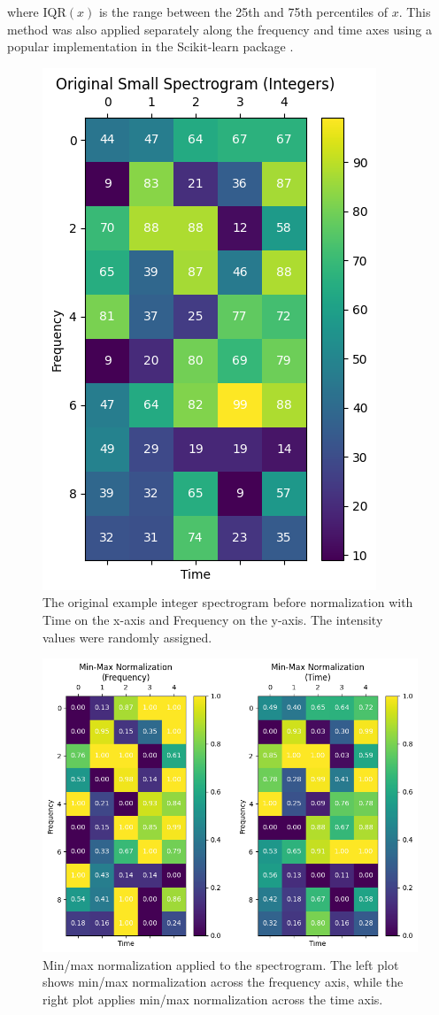 \documentclass[conference]{IEEEtran}
\begin{document}
where \( \text{IQR}(x) \) is the range between the 25th and 75th percentiles of \( x \). This method was also applied separately along the frequency and time axes using a popular implementation in the Scikit-learn package \cite{scikit-learn}.


\begin{figure}[!htb]
\centering
\includegraphics[width=0.6\linewidth]{original.png}
\caption{The original example integer spectrogram before normalization with Time on the x-axis and Frequency on the y-axis. The intensity values were randomly assigned.}
\label{fig:original}
\end{figure}

\begin{figure}[!htb]
\centering
\includegraphics[width=\linewidth]{min_max_normalization.png}
\caption{Min/max normalization applied to the spectrogram. The left plot shows min/max normalization across the frequency axis, while the right plot applies min/max normalization across the time axis.}
\label{fig:min_max_normalization}
\end{figure}
\end{document}
